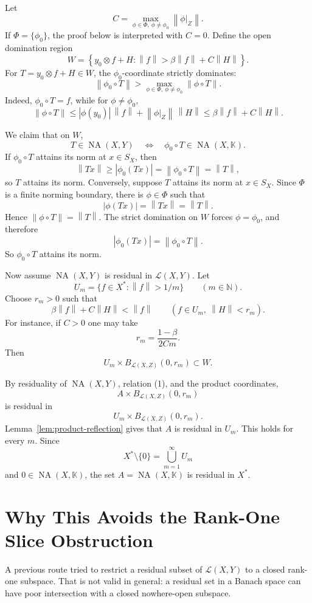 \documentclass[11pt]{article}
\newcommand{\K}{\mathbb K}
\newcommand{\NA}{\operatorname{NA}}
\newcommand{\calL}{\mathcal L}
\newcommand{\norm}[1]{\left\lVert #1 \right\rVert}
\begin{document}
Let
\[
  C=\max_{\phi\in\Phi,\ \phi\neq\phi_0}\norm{\phi|_Z}.
\]
If \(\Phi=\{\phi_0\}\), the proof below is interpreted with \(C=0\).
Define the open domination region
\[
  W=\left\{y_0\otimes f+H:
    \norm{f}>\beta\norm{f}+C\norm{H}\right\}.
\]
For \(T=y_0\otimes f+H\in W\), the \(\phi_0\)-coordinate strictly dominates:
\[
  \norm{\phi_0\circ T}
  >
  \max_{\phi\in\Phi,\ \phi\neq\phi_0}\norm{\phi\circ T}.
\]
Indeed, \(\phi_0\circ T=f\), while for \(\phi\neq\phi_0\),
\[
  \norm{\phi\circ T}
  \leq |\phi(y_0)|\,\norm{f}+\norm{\phi|_Z}\,\norm{H}
  \leq \beta\norm{f}+C\norm{H}.
\]

We claim that on \(W\),
\[
  T\in\NA(X,Y)
  \quad\Longleftrightarrow\quad
  \phi_0\circ T\in\NA(X,\K).
  \tag{1}
\]
If \(\phi_0\circ T\) attains its norm at \(x\in S_X\), then
\[
  \norm{Tx}\geq |\phi_0(Tx)|
  =\norm{\phi_0\circ T}
  =\norm{T},
\]
so \(T\) attains its norm.  Conversely, suppose \(T\) attains its norm at
\(x\in S_X\).  Since \(\Phi\) is a finite norming boundary, there is
\(\phi\in\Phi\) such that
\[
  |\phi(Tx)|=\norm{Tx}=\norm{T}.
\]
Hence \(\norm{\phi\circ T}=\norm{T}\).  The strict domination on \(W\) forces
\(\phi=\phi_0\), and therefore
\[
  |\phi_0(Tx)|=\norm{\phi_0\circ T}.
\]
So \(\phi_0\circ T\) attains its norm.

Now assume \(\NA(X,Y)\) is residual in \(\calL(X,Y)\).  Let
\[
  U_m=\{f\in X^*: \norm{f}>1/m\}\qquad (m\in\mathbb N).
\]
Choose \(r_m>0\) such that
\[
  \beta\norm{f}+C\norm{H}<\norm{f}
  \qquad (f\in U_m,\ \norm{H}<r_m).
\]
For instance, if \(C>0\) one may take
\[
  r_m=\frac{1-\beta}{2Cm}.
\]
Then
\[
  U_m\times B_{\calL(X,Z)}(0,r_m)\subset W.
\]

By residuality of \(\NA(X,Y)\), relation (1), and the product coordinates,
\[
  A\times B_{\calL(X,Z)}(0,r_m)
\]
is residual in
\[
  U_m\times B_{\calL(X,Z)}(0,r_m).
\]
Lemma~\ref{lem:product-reflection} gives that \(A\) is residual in \(U_m\).
This holds for every \(m\).  Since
\[
  X^*\setminus\{0\}=\bigcup_{m=1}^\infty U_m
\]
and \(0\in\NA(X,\K)\), the set \(A=\NA(X,\K)\) is residual in \(X^*\).

\section*{Why This Avoids the Rank-One Slice Obstruction}

A previous route tried to restrict a residual subset of \(\calL(X,Y)\) to a
closed rank-one subspace.  That is not valid in general: a residual set in a
Banach space can have poor intersection with a closed nowhere-open subspace.
\end{document}
